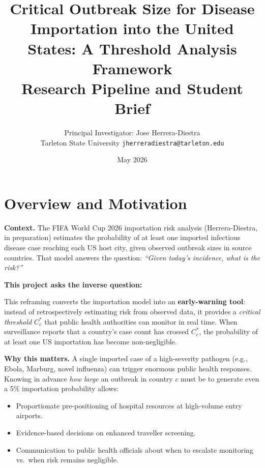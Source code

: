 \documentclass[12pt]{article}
\title{\textbf{Critical Outbreak Size for Disease Importation into the
United States: A Threshold Analysis Framework}\\[0.5em]
\large Research Pipeline and Student Brief}
\author{Principal Investigator: Jose Herrera-Diestra\\
\small Tarleton State University \quad
\texttt{jherreradiestra@tarleton.edu}}
\date{May 2026}
\begin{document}
\maketitle

\tableofcontents
\newpage

\section*{Overview and Motivation}

\textbf{Context.} The FIFA World Cup 2026 importation risk analysis
(Herrera-Diestra, in preparation) estimates the probability of at least
one imported infectious disease case reaching each US host city, given
observed outbreak sizes in source countries. That model answers the
question: \textit{``Given today's incidence, what is the risk?''}

\textbf{This project asks the inverse question:}

\begin{center}
\end{center}

This reframing converts the importation model into an
\textbf{early-warning tool}: instead of retrospectively estimating
risk from observed data, it provides a \emph{critical threshold}
$C_c^*$ that public health authorities can monitor in real time.
When surveillance reports that a country's case count has crossed
$C_c^*$, the probability of at least one US importation has become
non-negligible.

\textbf{Why this matters.} A single imported case of a high-severity
pathogen (e.g., Ebola, Marburg, novel influenza) can trigger enormous
public health responses. Knowing in advance \emph{how large} an
outbreak in country $c$ must be to generate even a 5\% importation
probability allows:

\begin{itemize}
  \item Proportionate pre-positioning of hospital resources at
        high-volume entry airports.
  \item Evidence-based decisions on enhanced traveller screening.
  \item Communication to public health officials about when to escalate
        monitoring vs.\ when risk remains negligible.
\end{itemize}
\end{document}
